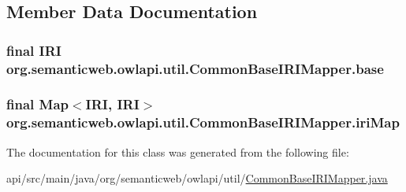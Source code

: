 \subsection{Member Data Documentation}
\hypertarget{classorg_1_1semanticweb_1_1owlapi_1_1util_1_1_common_base_i_r_i_mapper_a3953923f758f75e26e97ad588bf7bfa0}{
\subsubsection[{base}]{\setlength{\rightskip}{0pt plus 5cm}final {\bf I\-R\-I} org.\-semanticweb.\-owlapi.\-util.\-Common\-Base\-I\-R\-I\-Mapper.\-base\hspace{0.3cm}{\ttfamily [private]}}}\label{classorg_1_1semanticweb_1_1owlapi_1_1util_1_1_common_base_i_r_i_mapper_a3953923f758f75e26e97ad588bf7bfa0}
\hypertarget{classorg_1_1semanticweb_1_1owlapi_1_1util_1_1_common_base_i_r_i_mapper_ad5b3ac1b783dfc8ddb2a42d2c8501fb2}{
\subsubsection[{iri\-Map}]{\setlength{\rightskip}{0pt plus 5cm}final Map$<${\bf I\-R\-I}, {\bf I\-R\-I}$>$ org.\-semanticweb.\-owlapi.\-util.\-Common\-Base\-I\-R\-I\-Mapper.\-iri\-Map\hspace{0.3cm}{\ttfamily [private]}}}\label{classorg_1_1semanticweb_1_1owlapi_1_1util_1_1_common_base_i_r_i_mapper_ad5b3ac1b783dfc8ddb2a42d2c8501fb2}


The documentation for this class was generated from the following file\-:\begin{DoxyCompactItemize}
\item 
api/src/main/java/org/semanticweb/owlapi/util/\hyperlink{_common_base_i_r_i_mapper_8java}{Common\-Base\-I\-R\-I\-Mapper.\-java}\end{DoxyCompactItemize}
